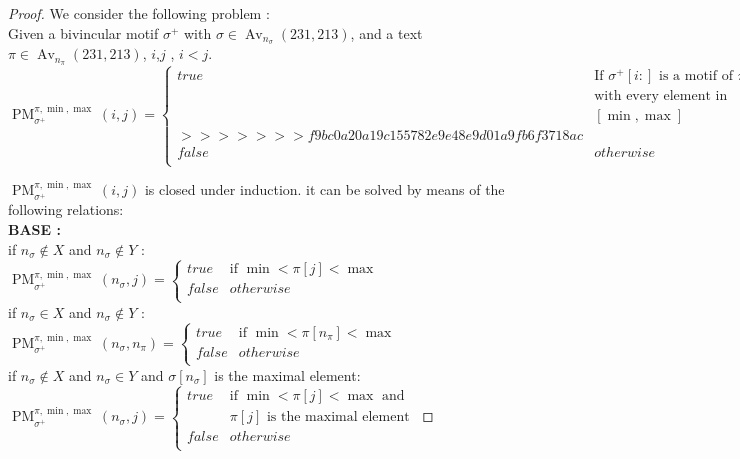 \documentclass[a4paper]{llncs}
\DeclareMathOperator{\Avd}{Av}
\newcommand\Av[2]{\Avd_{{#1}}({#2})}
\newcommand{\ptext}{\pi}
\newcommand{\pmotif}{\sigma}
\newcommand{\x}{X}
\newcommand{\y}{Y}
\newcommand{\pbmotif}{\pmotif^+}
\DeclareMathOperator{\PMa}{PM}
\newcommand{\PM}[6]{\PMa_{{#1}}^{{#2},{#3},{#4}}({#5},{#6})}
\begin{document}
					
\begin{proof}
We consider the following problem :\\
Given a bivincular motif $\pbmotif$ with $\pmotif \in \Av{n_\pmotif}{231,213} $, and a text $\ptext \in \Av{n_\ptext}{231,213}$, $i$,$j$ , $i<j$.\\

$
\PM{\pbmotif}{\ptext}{\min}{\max}{i}{j}=
\begin{cases}
	true 	& \text{If $\pbmotif[i:]$ is a motif of $\ptext[j:]$}\\
			& \text{with every element in}\\ 
			&[\min,\max]\\
>>>>>>> f9bc0a20a19c155782e9e48e9d01a9fb6f3718ac
			
			&\\

	false 	& otherwise\\
\end{cases}
$
			
$\PM{\pbmotif}{\ptext}{\min}{\max}{i}{j}$ is closed under induction. 
it can be solved by means of the following relations:\\
				
\textbf{BASE :} \\
if $n_\pmotif \notin  \x $ and $n_\pmotif \notin  \y$ : \\	
$
\PM{\pbmotif}{\ptext}{\min}{\max}{n_\pmotif}{j} =
\begin{cases}
	true 	& \text{if $\min<\ptext[j]<\max$}\\
	false 	& otherwise\\
\end{cases}
$
\\
			
if $n_\pmotif \in  \x $ and $n_\pmotif \notin  \y$ : \\		
$
\PM{\pbmotif}{\ptext}{\min}{\max}{n_\pmotif}{n_\ptext} =
\begin{cases}
	true 	& \text{if $\min<\ptext[n_\ptext]<\max$}\\
	false 	& otherwise\\
\end{cases}
$
\\
			
if $n_\pmotif \notin  \x$  and $n_\pmotif \in  \y$ and $\pmotif[n_\pmotif]$ is the maximal element: \\		
$
\PM{\pbmotif}{\ptext}{\min}{\max}{n_\pmotif}{j}=
\begin{cases}
	true 	& \text{if $\min<\ptext[j]<\max$ and }\\
			&\text{$\ptext[j]$ is the maximal element}\\
	false 	& otherwise\\
\end{cases}
$
			

\end{proof}
\end{document}
